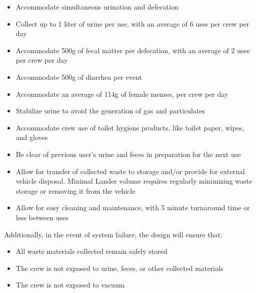     \begin{itemize}
        \item Accommodate simultaneous urination and defecation
        \item Collect up to 1 liter of urine per use, with an average of 6 uses per crew per day
        \item Accommodate 500g of fecal matter per defecation, with an average of 2 uses per crew per day
        \item Accommodate 500g of diarrhea per event
        \item Accommodate an average of 114g of female menses, per crew per day
        \item Stabilize urine to avoid the generation of gas and particulates
        \item Accommodate crew use of toilet hygiene products, like toilet paper, wipes, and gloves
        \item Be clear of previous user’s urine and feces in preparation for the next use
        \item Allow for transfer of collected waste to storage  and/or provide for external vehicle disposal. Minimal Lander volume requires regularly minimizing waste storage or removing it from the vehicle
        \item Allow for easy cleaning and maintenance, with 5 minute turnaround time or less between uses
    \end{itemize}

    Additionally, in the event of system failure, the design will ensure that:

    \begin{itemize}
        \item All waste materials collected remain safely stored
        \item The crew is not exposed to urine, feces, or other collected materials
        \item The crew is not exposed to vacuum
    \end{itemize}



